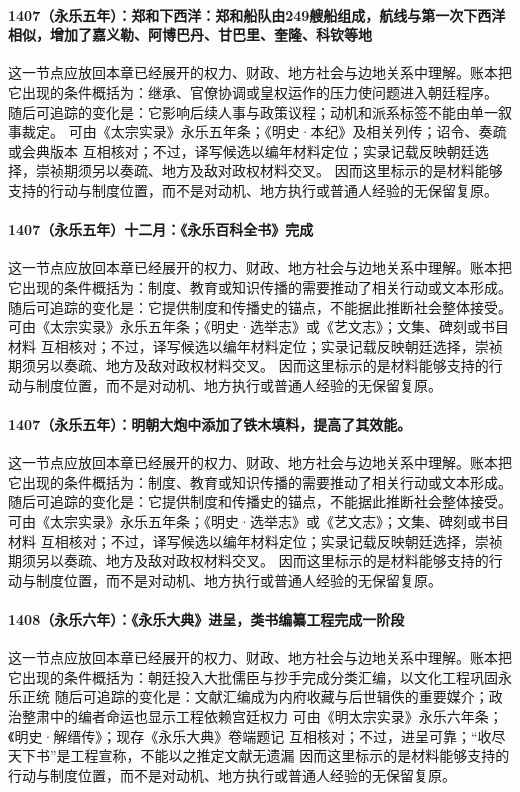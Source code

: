 \paragraph{1407（永乐五年）：郑和下西洋：郑和船队由249艘船组成，航线与第一次下西洋相似，增加了嘉义勒、阿博巴丹、甘巴里、奎隆、科钦等地} 这一节点应放回本章已经展开的权力、财政、地方社会与边地关系中理解。账本把它出现的条件概括为：继承、官僚协调或皇权运作的压力使问题进入朝廷程序。 随后可追踪的变化是：它影响后续人事与政策议程；动机和派系标签不能由单一叙事裁定。 可由《太宗实录》永乐五年条；《明史·本纪》及相关列传；诏令、奏疏或会典版本 互相核对；不过，译写候选以编年材料定位；实录记载反映朝廷选择，崇祯期须另以奏疏、地方及敌对政权材料交叉。 因而这里标示的是材料能够支持的行动与制度位置，而不是对动机、地方执行或普通人经验的无保留复原。

\paragraph{1407（永乐五年）十二月：《永乐百科全书》完成} 这一节点应放回本章已经展开的权力、财政、地方社会与边地关系中理解。账本把它出现的条件概括为：制度、教育或知识传播的需要推动了相关行动或文本形成。 随后可追踪的变化是：它提供制度和传播史的锚点，不能据此推断社会整体接受。 可由《太宗实录》永乐五年条；《明史·选举志》或《艺文志》；文集、碑刻或书目材料 互相核对；不过，译写候选以编年材料定位；实录记载反映朝廷选择，崇祯期须另以奏疏、地方及敌对政权材料交叉。 因而这里标示的是材料能够支持的行动与制度位置，而不是对动机、地方执行或普通人经验的无保留复原。

\paragraph{1407（永乐五年）：明朝大炮中添加了铁木填料，提高了其效能。} 这一节点应放回本章已经展开的权力、财政、地方社会与边地关系中理解。账本把它出现的条件概括为：制度、教育或知识传播的需要推动了相关行动或文本形成。 随后可追踪的变化是：它提供制度和传播史的锚点，不能据此推断社会整体接受。 可由《太宗实录》永乐五年条；《明史·选举志》或《艺文志》；文集、碑刻或书目材料 互相核对；不过，译写候选以编年材料定位；实录记载反映朝廷选择，崇祯期须另以奏疏、地方及敌对政权材料交叉。 因而这里标示的是材料能够支持的行动与制度位置，而不是对动机、地方执行或普通人经验的无保留复原。

\paragraph{1408（永乐六年）：《永乐大典》进呈，类书编纂工程完成一阶段} 这一节点应放回本章已经展开的权力、财政、地方社会与边地关系中理解。账本把它出现的条件概括为：朝廷投入大批儒臣与抄手完成分类汇编，以文化工程巩固永乐正统 随后可追踪的变化是：文献汇编成为内府收藏与后世辑佚的重要媒介；政治整肃中的编者命运也显示工程依赖宫廷权力 可由《明太宗实录》永乐六年条；《明史·解缙传》；现存《永乐大典》卷端题记 互相核对；不过，进呈可靠；“收尽天下书”是工程宣称，不能以之推定文献无遗漏 因而这里标示的是材料能够支持的行动与制度位置，而不是对动机、地方执行或普通人经验的无保留复原。

